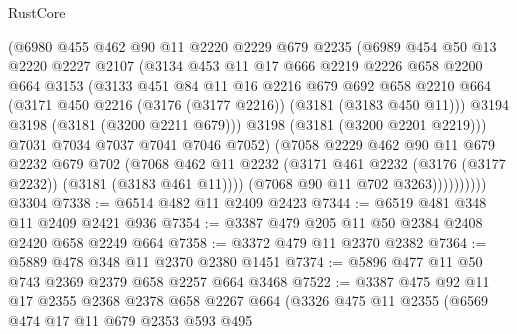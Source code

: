 \begin{lexlean}{RustCore}
\begin{coremodule}
                  (@6980
                    @455
                    @462
                    @90
                    @11
                    @2220
                    @2229
                    @679
                    @2235
                    (@6989
                      @454
                      @50
                      @13
                      @2220
                      @2227
                      @2107
                      (@3134
                        @453
                        @11
                        @17
                        @666
                        @2219
                        @2226
                        @658
                        @2200
                        @664
                        @3153
                        (@3133
                          @451
                          @84
                          @11
                          @16
                          @2216
                          @679
                          @692
                          @658
                          @2210
                          @664
                          (@3171 @450 @2216 (@3176 (@3177 @2216)) (@3181 (@3183 @450 @11)))
                          @3194
                          @3198
                          (@3181 (@3200 @2211 @679)))
                        @3198
                        (@3181 (@3200 @2201 @2219)))
                      @7031
                      @7034
                      @7037
                      @7041
                      @7046
                      @7052)
                    (@7058
                      @2229
                      @462
                      @90
                      @11
                      @679
                      @2232
                      @679
                      @702
                      (@7068
                        @462
                        @11
                        @2232
                        (@3171 @461 @2232 (@3176 (@3177 @2232)) (@3181 (@3183 @461 @11))))
                      (@7068 @90 @11 @702 @3263))))))))))
    @3304
@7338 := @6514 @482 @11 @2409 @2423
@7344 := @6519 @481 @348 @11 @2409 @2421 @936
@7354 := @3387 @479 @205 @11 @50 @2384 @2408 @2420 @658 @2249 @664
@7358 := @3372 @479 @11 @2370 @2382
@7364 := @5889 @478 @348 @11 @2370 @2380 @1451
@7374 := @5896 @477 @11 @50 @743 @2369 @2379 @658 @2257 @664 @3468
@7522 := @3387
    @475
    @92
    @11
    @17
    @2355
    @2368
    @2378
    @658
    @2267
    @664
    (@3326
      @475
      @11
      @2355
      (@6569
        @474
        @17
        @11
        @679
        @2353
        @593
        @495

\end{coremodule}
\end{lexlean}
